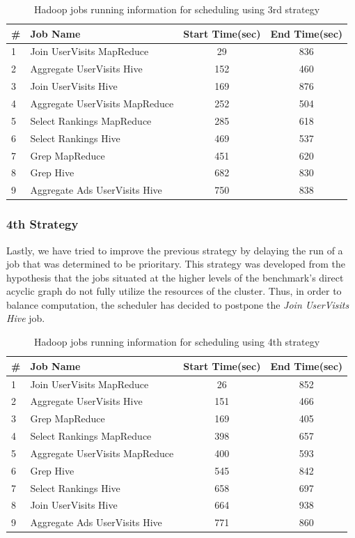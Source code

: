 \documentclass[11pt,a4paper,twoside]{report}
\begin{document}
\begin{table}[h]
\centering
\begin{tabular}{|l|l|c|c|}
\hline
\textbf{\#} & \textbf{Job Name} & \textbf{Start Time(sec)} & \textbf{End Time(sec)} \\ \hline
1 & Join UserVisits MapReduce & 29 & 836 \\ \hline
2 & Aggregate UserVisits Hive & 152 & 460  \\ \hline
3 & Join UserVisits Hive & 169 & 876 \\ \hline
4 & Aggregate UserVisits MapReduce & 252 & 504 \\ \hline
5 & Select Rankings MapReduce & 285 & 618 \\ \hline
6 & Select Rankings Hive & 469 & 537 \\ \hline 
7 & Grep MapReduce & 451 & 620 \\ \hline
8 & Grep Hive & 682 & 830 \\ \hline
9 & Aggregate Ads UserVisits Hive & 750 & 838 \\ \hline
\end{tabular}
\caption{Hadoop jobs running information for scheduling using 3rd strategy}
\label{tab:DronTest3Jobs}
\end{table}

\subsubsection{4th Strategy}
Lastly, we have tried to improve the previous strategy by delaying the run of a job that was determined to be prioritary. This strategy was developed from the hypothesis that the jobs situated at the higher levels of the benchmark's direct acyclic graph do not fully utilize the resources of the cluster. Thus, in order to balance computation, the scheduler has decided to postpone the \textit{Join UserVisits Hive} job.


\begin{table}[h]
\centering
\begin{tabular}{|l|l|c|c|}
\hline
\textbf{\#} & \textbf{Job Name} & \textbf{Start Time(sec)} & \textbf{End Time(sec)} \\ \hline
1 & Join UserVisits MapReduce & 26 & 852 \\ \hline
2 & Aggregate UserVisits Hive & 151 & 466  \\ \hline
3 & Grep MapReduce & 169 & 405 \\ \hline
4 & Select Rankings MapReduce & 398 & 657 \\ \hline
5 & Aggregate UserVisits MapReduce & 400 & 593 \\ \hline
6 & Grep Hive & 545 & 842 \\ \hline
7 & Select Rankings Hive & 658 & 697 \\ \hline 
8 & Join UserVisits Hive & 664 & 938 \\ \hline
9 & Aggregate Ads UserVisits Hive & 771 & 860 \\ \hline
\end{tabular}
\caption{Hadoop jobs running information for scheduling using 4th strategy}
\label{tab:DronTest4Jobs}
\end{table}
\end{document}
